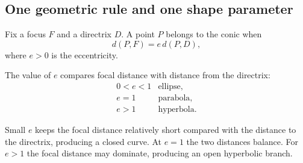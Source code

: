 \subsection{One geometric rule and one shape parameter}

Fix a focus $F$ and a directrix $D$. A point $P$ belongs to the conic when
\[
\boxed{d(P,F)=e\,d(P,D)},
\]
where $e>0$ is the eccentricity.

The value of $e$ compares focal distance with distance from the directrix:
\[
\begin{array}{c|c}
0<e<1 & \text{ellipse},\\
e=1 & \text{parabola},\\
e>1 & \text{hyperbola}.
\end{array}
\]

\begin{center}
\end{center}

\begin{interpretationbox}
Small $e$ keeps the focal distance relatively short compared with the distance
to the directrix, producing a closed curve. At $e=1$ the two distances balance.
For $e>1$ the focal distance may dominate, producing an open hyperbolic branch.
\end{interpretationbox}
